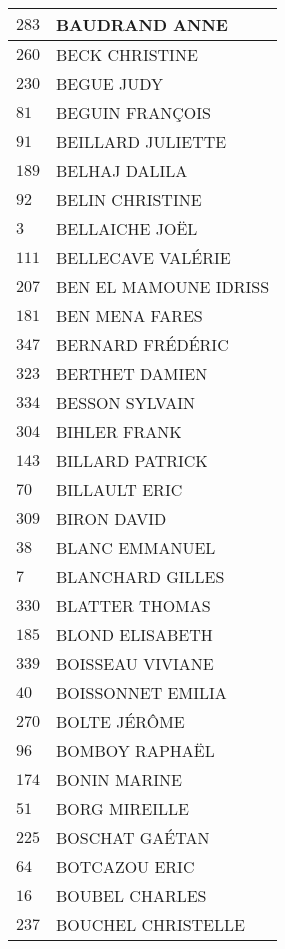 \begin{xltabular}{\linewidth}{|l|X|}
    \hline
    $283$ & BAUDRAND ANNE \\
    \hline
    $260$ & BECK CHRISTINE \\
    \hline
    $230$ & BEGUE JUDY \\
    \hline
    $81$ & BEGUIN FRANÇOIS \\
    \hline
    $91$ & BEILLARD JULIETTE \\
    \hline
    $189$ & BELHAJ DALILA \\
    \hline
    $92$ & BELIN CHRISTINE \\
    \hline
    $3$ & BELLAICHE JOËL \\
    \hline
    $111$ & BELLECAVE VALÉRIE \\
    \hline
    $207$ & BEN EL MAMOUNE IDRISS \\
    \hline
    $181$ & BEN MENA FARES \\
    \hline
    $347$ & BERNARD FRÉDÉRIC \\
    \hline
    $323$ & BERTHET DAMIEN \\
    \hline
    $334$ & BESSON SYLVAIN \\
    \hline
    $304$ & BIHLER FRANK \\
    \hline
    $143$ & BILLARD PATRICK \\
    \hline
    $70$ & BILLAULT ERIC \\
    \hline
    $309$ & BIRON DAVID \\
    \hline
    $38$ & BLANC EMMANUEL \\
    \hline
    $7$ & BLANCHARD GILLES \\
    \hline
    $330$ & BLATTER THOMAS \\
    \hline
    $185$ & BLOND ELISABETH \\
    \hline
    $339$ & BOISSEAU VIVIANE \\
    \hline
    $40$ & BOISSONNET EMILIA \\
    \hline
    $270$ & BOLTE JÉRÔME \\
    \hline
    $96$ & BOMBOY RAPHAËL \\
    \hline
    $174$ & BONIN MARINE \\
    \hline
    $51$ & BORG MIREILLE \\
    \hline
    $225$ & BOSCHAT GAÉTAN \\
    \hline
    $64$ & BOTCAZOU ERIC \\
    \hline
    $16$ & BOUBEL CHARLES \\
    \hline
    $237$ & BOUCHEL CHRISTELLE \\
    \hline

\end{xltabular}
